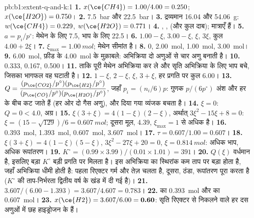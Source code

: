 \begin{solution}{pb:b1:extent-q-and-k:1}
\textbf{1.} $x(\ce{CH4}) = 1.00/4.00 = 0.250$; $x(\ce{H2O}) = 0.750$।
\textbf{2.} \qty{7.5}{bar} और \qty{22.5}{bar}।
\textbf{3.} द्रव्यमान 16.04 और \qty{54.06}{g}: $w(\ce{CH4}) = 0.229$,
$w(\ce{H2O}) = 0.771$।
\textbf{4.} , ,  (और
कुल दाब); मात्राएँ  हैं।
\textbf{5.} $a = p_i/p^\circ$: मेथेन के लिए 7.5, भाप के लिए 22.5।
\textbf{6.}  $1.00 - \xi$,  $3.00 - \xi$,  $\xi$,
 $3\xi$, कुल $4.00 + 2\xi$।
\textbf{7.} $\xi_{\max} = \qty{1.00}{mol}$; मेथेन सीमांत है।
\textbf{8.}  0,  \qty{2.00}{mol},  \qty{1.00}{mol},
 \qty{3.00}{mol}।
\textbf{9.} \qty{6.00}{mol}, फ़ीड के \qty{4.00}{mol} के मुक़ाबले: अभिक्रिया
दो अणुओं से चार अणु बनाती है।
\textbf{10.}  0.333,  0.167,  0.500।
\textbf{11.} ताकि पूरी मेथेन अभिक्रिया कर ले और सृति अभिक्रिया के लिए
भाप बचे, जिसका भागफल वह घटाती है।
\textbf{12.}  $1 - \xi$,  $2 - \xi$,  $\xi$, 
$3 + \xi$, हर प्रगति पर कुल 6.00।
\textbf{13.} $Q = \dfrac{(p_{\ce{CO2}}/p^\circ)(p_{\ce{H2}}/p^\circ)}
{(p_{\ce{CO}}/p^\circ)(p_{\ce{H2O}}/p^\circ)}$, जहाँ $p_i = (n_i/6)p$: गुणक
$p/(6p^\circ)$ अंश और हर के बीच कट जाते हैं (हर ओर दो गैस
अणु), और दिया गया व्यंजक बचता है।
\textbf{14.} $\xi = 0$: $Q = 0 < 4.0$, अग्र।
\textbf{15.} $\xi(3 + \xi) = 4(1 - \xi)(2 - \xi)$, अर्थात् $3\xi^2 - 15\xi +
8 = 0$: $\xi = (15 - \sqrt{129})/6 = \qty{0.607}{mol}$; दूसरा मूल,
4.39, $\xi_{\max} = 1$ से अधिक है।
\textbf{16.}  \qty{0.393}{mol},  \qty{1.393}{mol},
 \qty{0.607}{mol},  \qty{3.607}{mol}।
\textbf{17.} $\tau = 0.607/1.00 = 0.607$।
\textbf{18.} $\xi(3 + \xi) = 4(1 - \xi)(5 - \xi)$, $3\xi^2 - 27\xi + 20 =
0$, $\xi = \qty{0.814}{mol}$: अधिक भाप, अधिक रूपांतरण।
\textbf{19.} $K^\circ = (0.99 \times 3.99)/(0.01 \times 1.01) = 391$।
\textbf{20.} $Q(\xi)$ वर्धमान है, इसलिए बड़ा $K^\circ$ बड़ी प्रगति पर
मिलता है। इस अभिक्रिया का स्थिरांक कम ताप पर बड़ा होता है, जहाँ अभिक्रिया
धीमी होती है: पहला रिएक्टर गर्म और तेज़ चलता है, दूसरा, ठंडा, रूपांतरण पूरा करता है
($K^\circ$ की ताप-निर्भरता द्वितीय वर्ष के खंड में दी गई है)।
\textbf{21.} $3.607/(6.00 - 1.393) = 3.607/4.607 = 0.783$।
\textbf{22.}  का \qty{0.393}{mol} और  का \qty{0.607}{mol}।
\textbf{23.} $x(\ce{H2}) = 3.607/6.00 = \textbf{0.60}$: सृति रिएक्टर से निकलने वाले हर
दस अणुओं में छह हाइड्रोजन के हैं।
\end{solution}
